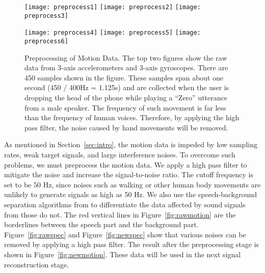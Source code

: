 \begin{figure}[H]
	\begin{minipage}[t]{.45\linewidth}
		\centering
		\texttt{[image: preprocess1]}
		\texttt{[image: preprocess2]}
		\vspace{-.2in}
		\label{fig:rawmotion}
		\vspace{.2in}
		\texttt{[image: preprocess3]}
		\vspace{-.2in}
		\label{fig:rawspec}
	\end{minipage}
	\begin{minipage}[t]{.05\linewidth}
		\quad
	\end{minipage}
	\begin{minipage}[t]{.45\linewidth}
		\centering
		\texttt{[image: preprocess4]}
		\vspace{-.2in}
		\label{fig:newspec}
		\vspace{.2in}
		\texttt{[image: preprocess5]}
		\texttt{[image: preprocess6]}
		\vspace{-.2in}
		\label{fig:newmotion}
	\end{minipage}
	
	\caption[Preprocessing of Motion Data. ]{Preprocessing of Motion Data. The top two figures show the raw data from 3-axis accelerometers and 3-axis gyroscopes. There are 450 samples shown in the figure. These samples span about one second (450 / 400Hz = 1.125s) and are collected when the user is dropping the head of the phone while playing a ``Zero'' utterance from a male speaker. The frequency of such movement is far less than the frequency of human voices. Therefore, by applying the high pass filter, the noise caused by hand movements will be removed. }
	
	\label{fig:spyphonepreprocess}
\end{figure}

As mentioned in Section~\ref{sec:intro}, the motion data is impeded by low sampling rates, weak target signals, and large  interference  noises. To overcome such problems, we must preprocess the motion data. We apply a high pass filter to mitigate the noise and increase the signal-to-noise ratio. The cutoff frequency is set to be 50 Hz, since noises such as walking or other human body movements are unlikely to generate signals as high as 50 Hz.
We also use the speech-background separation algorithms from \cite{rabiner2011theory} to differentiate the data affected by sound signals from those do not. The red vertical lines in Figure~\ref{fig:rawmotion} are the borderlines between the speech part and the background part. 
Figure~\ref{fig:rawspec} and Figure~\ref{fig:newspec} show that various noises can be removed by applying a high pass filter.
The result after the preprocessing stage is shown in Figure~\ref{fig:newmotion}. These data will be used in the next signal reconstruction stage.



